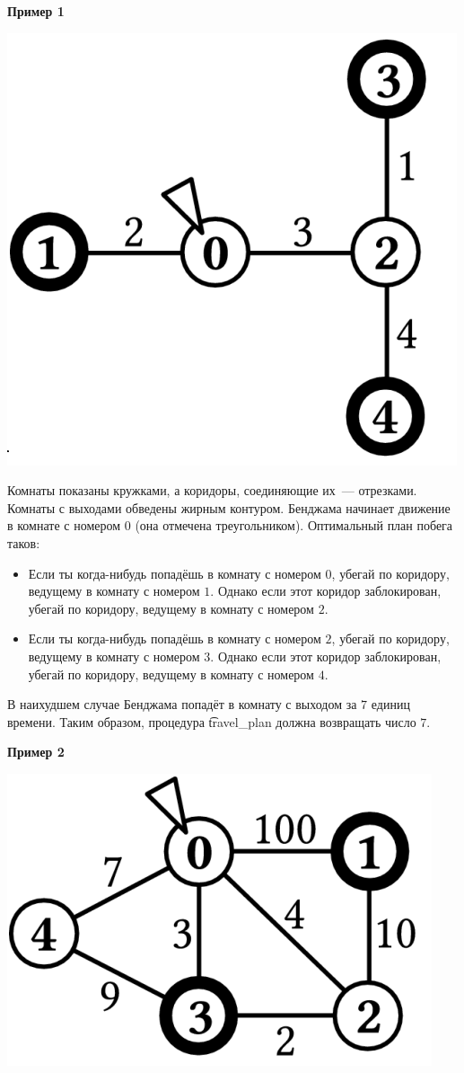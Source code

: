 \bf{Пример 1}

\includegraphics{crocodile1.png}

Комнаты показаны кружками, а коридоры, соединяющие их~--- отрезками. Комнаты с выходами обведены жирным контуром. Бенджама начинает движение в комнате с номером $0$ (она отмечена треугольником). Оптимальный план побега таков:

\begin{itemize}
\item Если ты когда-нибудь попадёшь в комнату с номером $0$, убегай по коридору, ведущему в комнату с номером $1$. Однако если этот коридор заблокирован, убегай по коридору, ведущему в комнату с номером $2$.
\item Если ты когда-нибудь попадёшь в комнату с номером $2$, убегай по коридору, ведущему в комнату с номером $3$. Однако если этот коридор заблокирован, убегай по коридору, ведущему в комнату с номером $4$.
\end{itemize}

В наихудшем случае Бенджама попадёт в комнату с выходом за $7$ единиц времени. Таким образом, процедура \t{travel\_plan} должна возвращать число $7$.

\bf{Пример 2}

\includegraphics{crocodile2.png}

